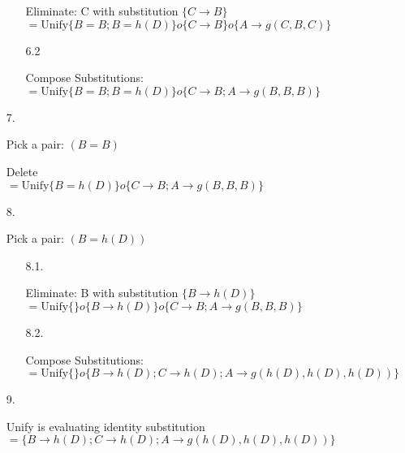 \begin{enumerate}
\begin{enumerate}
	Eliminate: C with substitution \( \{ C \rightarrow B \} \) \\
	\hspace*{4mm}\( = \text{Unify} \{ B = B; B = h(D) \} o \{ C \rightarrow B \} o \{ A \rightarrow g(C,B,C) \} \)
	
	\item[6.2]
	
	Compose Substitutions: \\
	\hspace*{4mm}\( = \text{Unify} \{ B = B; B = h(D) \} o \{ C \rightarrow B; A \rightarrow g(B, B, B) \} \)
	\end{enumerate}
	
	\item[7.]
	
	Pick a pair: \( (B = B) \)
	
	Delete \\
	\hspace*{4mm}\( = \text{Unify} \{ B = h(D) \} o \{ C \rightarrow B; A \rightarrow g(B, B, B) \} \)

	\item[8.]
	
	Pick a pair:  \( (B = h(D)) \)
	
	\begin{enumerate}
	
    	\item[8.1.]
    	
    	Eliminate: B with substitution \( \{ B \rightarrow h(D) \} \) \\
    	\hspace*{4mm}\( = \text{Unify} \{ \} o \{ B \rightarrow h(D) \} o \{ C \rightarrow B; A \rightarrow g(B, B, B) \} \)
    	
    	\item[8.2.]
    	
    	Compose Substitutions: \\
    	\hspace*{4mm}\( = \text{Unify} \{ \} o \{ B \rightarrow h(D); C \rightarrow h(D); A \rightarrow g(h(D), h(D), h(D) ) \} \)
	\end{enumerate}
	
	\item[9.]
	
	Unify is evaluating identity substitution \\
    	\hspace*{4mm}\( = \{ B \rightarrow h(D); C \rightarrow h(D); A \rightarrow g(h(D), h(D), h(D) ) \} \)
\end{enumerate}

